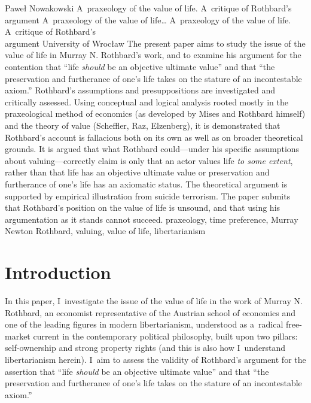 \begin{artengenv}{Paweł Nowakowski}
	{A~praxeology of the value of life. A~critique of Rothbard's argument}
	{A~praxeology of the value of life\ldots}
	{A~praxeology of the value of life. A~critique of Rothbard's\\argument}
	{University of Wrocław\label{nowakowski-first}}
	{The present paper aims to study the issue of the value of life in Murray N. Rothbard's work, and to examine his argument for the contention that ``life \textit{should} be an objective ultimate value'' and that ``the preservation and furtherance of one's life takes on the stature of an incontestable axiom.'' Rothbard's assumptions and presuppositions are investigated and critically assessed. Using conceptual and logical analysis rooted mostly in the praxeological method of economics (as developed by Mises and Rothbard himself) and the theory of value (Scheffler, Raz, Elzenberg), it is demonstrated that Rothbard's account is fallacious both on its own as well as on broader theoretical grounds. It is argued that what Rothbard could---under his specific assumptions about valuing---correctly claim is only that an actor values life \textit{to some extent}, rather than that life has an objective ultimate value or preservation and furtherance of one's life has an axiomatic status. The theoretical argument is supported by empirical illustration from suicide terrorism. The paper submits that Rothbard's position on the value of life is unsound, and that using his argumentation as it stands cannot succeed.
	}
	{praxeology, time preference, Murray Newton Rothbard, valuing, value of life, libertarianism}







\section{Introduction}

\lettrine[loversize=0.13,lines=2,lraise=-0.03,nindent=0em,findent=0.2pt]%
{I}{}n this paper, I~investigate the issue of the value of life in the work of Murray N. Rothbard, an economist representative of the Austrian school of economics and one of the leading figures in modern libertarianism, understood as a~radical free-market current in the contemporary political philosophy, built upon two pillars: self-ownership and strong property rights 
\parencites[see][]{Rothbard2006For}[][]{Rothbard2009Man} %
 (and this is also how I~understand libertarianism herein). I~aim to assess the validity of Rothbard's 
\parencite*[][pp.32–33]{Rothbard1998Ethics} %
 argument for the assertion that ``life \textit{should} be an objective ultimate value'' and that ``the preservation and furtherance of one's life takes on the stature of an incontestable axiom.''




\end{artengenv}
